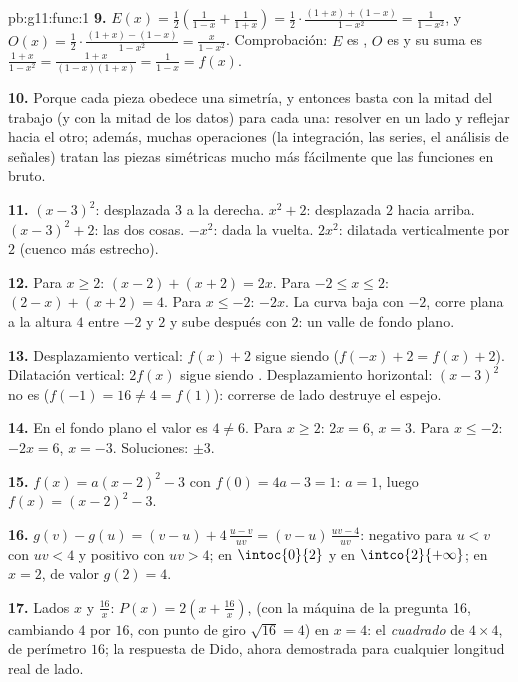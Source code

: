 \begin{solution}{pb:g11:func:1}
\textbf{9.} $E(x) = \frac12\left(\frac{1}{1 - x} + \frac{1}{1 +
x}\right) = \frac12 \cdot \frac{(1 + x) + (1 - x)}{1 - x^2}
= \frac{1}{1 - x^2}$, y
$O(x) = \frac12 \cdot \frac{(1 + x) - (1 - x)}{1 - x^2}
= \frac{x}{1 - x^2}$. Comprobación: $E$ es , $O$ es  y su suma es
$\frac{1 + x}{1 - x^2} = \frac{1 + x}{(1 - x)(1 + x)} = \frac{1}{1 - x} =
f(x)$.

\textbf{10.} Porque cada pieza obedece una simetría, y entonces basta con
la mitad del trabajo (y con la mitad de los datos) para cada una:
resolver en un lado y reflejar hacia el otro; además, muchas operaciones
(la integración, las series, el análisis de señales) tratan las piezas
simétricas mucho más fácilmente que las funciones en bruto.

\textbf{11.} $(x-3)^2$: desplazada $3$ a la derecha. $x^2 + 2$:
desplazada $2$ hacia arriba. $(x-3)^2 + 2$: las dos cosas. $-x^2$: dada la
vuelta. $2x^2$: dilatada verticalmente por $2$ (cuenco más estrecho).

\textbf{12.} Para $x \geq 2$: $(x - 2) + (x + 2) = 2x$. Para
$-2 \leq x \leq 2$: $(2 - x) + (x + 2) = 4$. Para $x \leq -2$: $-2x$. La
curva baja con  $-2$, corre plana a la altura $4$ entre $-2$ y
$2$ y sube después con  $2$: un valle de fondo plano.

\textbf{13.} Desplazamiento vertical: $f(x) + 2$ sigue siendo 
($f(-x) + 2 = f(x) + 2$). Dilatación vertical: $2f(x)$ sigue siendo .
Desplazamiento horizontal: $(x - 3)^2$ no es 
($f(-1) = 16 \neq 4 = f(1)$): correrse de lado destruye el espejo.

\textbf{14.} En el fondo plano el valor es $4 \neq 6$. Para $x \geq 2$:
$2x = 6$, $x = 3$. Para $x \leq -2$: $-2x = 6$, $x = -3$. Soluciones:
$\pm 3$.

\textbf{15.} $f(x) = a(x - 2)^2 - 3$ con $f(0) = 4a - 3 = 1$: $a = 1$,
luego $f(x) = (x - 2)^2 - 3$.

\textbf{16.} $g(v) - g(u) = (v - u) + 4\,\frac{u - v}{uv}
= (v - u)\,\frac{uv - 4}{uv}$: negativo para $u < v$ con $uv < 4$ y
positivo con $uv > 4$;  en $\intoc{0}{2}$ y  en
$\intco{2}{+\infty}$;  en $x = 2$, de valor $g(2) = 4$.

\textbf{17.} Lados $x$ y $\frac{16}{x}$:
$P(x) = 2\left(x + \frac{16}{x}\right)$,  (con la máquina de la
pregunta 16, cambiando $4$ por $16$, con punto de giro $\sqrt{16} = 4$) en
$x = 4$: el \emph{cuadrado} de $4 \times 4$, de perímetro $16$; la
respuesta de Dido, ahora demostrada para cualquier longitud real de lado.


\end{solution}
